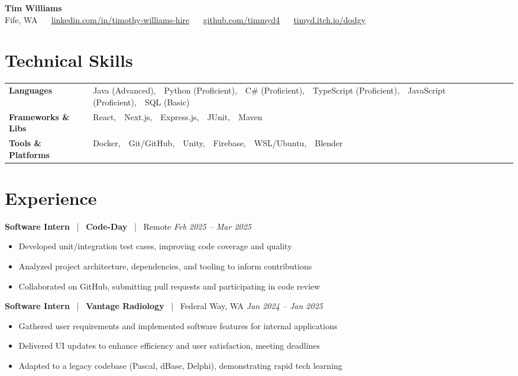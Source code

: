 \documentclass[10pt, letterpaper]{article}
\newcommand{\jobhead}[4]{%
  \vspace{5pt}%
  {\bfseries\color{dark}#1}%
  ~{\color{light}|}~%
  {\bfseries\color{navy}#2}%
  ~{\color{light}|}~%
  {\color{light}#3}%
  \hfill{\color{light}\small\textit{#4}}\\[-2pt]%
}
\newcommand{\skillrow}[2]{%
  {\bfseries #1} & #2 \\[2pt]%
}
\begin{document}

\begin{center}
  {\huge\bfseries\color{navy} Tim Williams}\\[4pt]
  {\small\color{light}
    Fife, WA
    ~\textbullet~
    \href{https://linkedin.com/in/timothy-williams-hire}{linkedin.com/in/timothy-williams-hire}
    ~\textbullet~
    \href{https://github.com/timmyd4}{github.com/timmyd4}
    ~\textbullet~
    \href{https://timyd.itch.io/dodgy}{timyd.itch.io/dodgy}
  }
\end{center}

\vspace{2pt}

\section{Technical Skills}

\begin{tabular}{@{}p{1.6in} p{5.2in}@{}}
  \skillrow{Languages}{Java (Advanced),\ \ Python (Proficient),\ \ C\# (Proficient),\ \ TypeScript (Proficient),\ \ JavaScript (Proficient),\ \ SQL (Basic)}
  \skillrow{Frameworks \& Libs}{React,\ \ Next.js,\ \ Express.js,\ \ JUnit,\ \ Maven}
  \skillrow{Tools \& Platforms}{Docker,\ \ Git/GitHub,\ \ Unity,\ \ Firebase,\ \ WSL/Ubuntu,\ \ Blender}
\end{tabular}

\section{Experience}

\jobhead{Software Intern}{Code-Day}{Remote}{Feb 2025 – Mar 2025}
\begin{itemize}
  \item Developed unit/integration test cases, improving code coverage and quality
  \item Analyzed project architecture, dependencies, and tooling to inform contributions
  \item Collaborated on GitHub, submitting pull requests and participating in code review
\end{itemize}

\jobhead{Software Intern}{Vantage Radiology}{Federal Way, WA}{Jan 2024 – Jan 2025}
\begin{itemize}
  \item Gathered user requirements and implemented software features for internal applications
  \item Delivered UI updates to enhance efficiency and user satisfaction, meeting deadlines
  \item Adapted to a legacy codebase (Pascal, dBase, Delphi), demonstrating rapid tech learning
\end{itemize}
\end{document}
